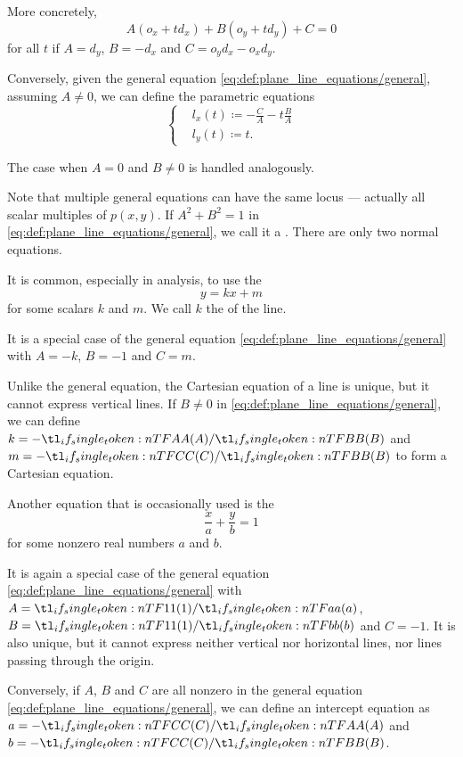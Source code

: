\begin{definition}
\begin{thmenum}
    More concretely,
    \begin{equation*}
      A(o_x + td_x) + B(o_y + td_y) + C = 0
    \end{equation*}
    for all \( t \) if \( A = d_y \), \( B = -d_x \) and \( C = o_y d_x - o_x d_y \).

    Conversely, given the general equation \eqref{eq:def:plane_line_equations/general}, assuming \( A \neq 0 \), we can define the parametric equations
    \begin{equation*}
      \begin{cases}
        &l_x(t) \coloneqq -\tfrac C A - t \tfrac B A  \\
        &l_y(t) \coloneqq t.
      \end{cases}
    \end{equation*}

    The case when \( A = 0 \) and \( B \neq 0 \) is handled analogously.

    Note that multiple general equations can have the same locus --- actually all scalar multiples of \( p(x, y) \). If \( A^2 + B^2 = 1 \) in \eqref{eq:def:plane_line_equations/general}, we call it a . There are only two normal equations.

     It is common, especially in analysis, to use the 
    \begin{equation}\label{eq:def:plane_line_equations/cartesian}
      y = kx + m
    \end{equation}
    for some scalars \( k \) and \( m \). We call \( k \) the  of the line.

    It is a special case of the general equation \eqref{eq:def:plane_line_equations/general} with \( A = -k \), \( B = -1 \) and \( C = m \).

    Unlike the general equation, the Cartesian equation of a line is unique, but it cannot express vertical lines. If \( B \neq 0 \) in \eqref{eq:def:plane_line_equations/general}, we can define \( k = -\ifrac A B \) and \( m = -\ifrac C B \) to form a Cartesian equation.

     Another equation that is occasionally used is the 
    \begin{equation}\label{eq:def:plane_line_equations/intercept}
      \frac x a + \frac y b = 1
    \end{equation}
    for some nonzero real numbers \( a \) and \( b \).

    It is again a special case of the general equation \eqref{eq:def:plane_line_equations/general} with \( A = \ifrac 1 a \), \( B = \ifrac 1 b \) and \( C = -1 \). It is also unique, but it cannot express neither vertical nor horizontal lines, nor lines passing through the origin.

    Conversely, if \( A \), \( B \) and \( C \) are all nonzero in the general equation \eqref{eq:def:plane_line_equations/general}, we can define an intercept equation as \( a = -\ifrac C A \) and \( b = -\ifrac C B \).
  \end{thmenum}
\end{definition}

